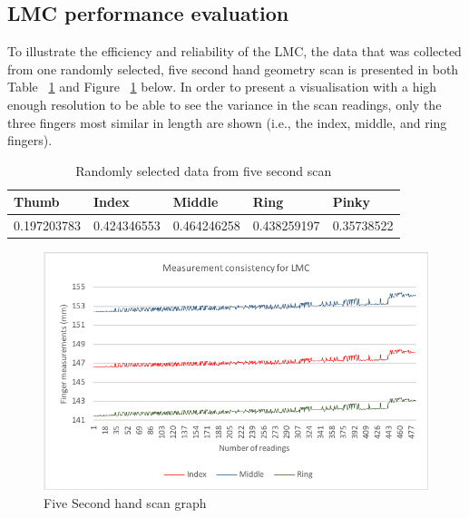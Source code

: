 \subsection{LMC performance evaluation}

To illustrate the efficiency and reliability of the LMC, the data that was collected from one randomly selected, five second hand geometry scan is presented in both Table ~\ref{table: Randomly selected data from five second scan} and Figure ~\ref{fig:Five Second hand scan graph} below. 
In order to present a visualisation with a high enough resolution to be able to see the variance in the scan readings, only the three fingers most similar in length are shown (i.e., the index, middle, and ring fingers). 

    
    \begin{table}[h!]
    \caption{Randomly selected data from five second scan}
    \centering
     \begin{tabular}{|p{} | p{}| p{}| p{}| p{}|} 
     \hline
    	\textbf{Thumb} & \textbf{Index} & \textbf{Middle} & \textbf{Ring} & \textbf{Pinky} \\ [1ex] 
     \hline\hline 
     0.197203783 & 0.424346553 &  0.464246258 & 0.438259197 & 0.35738522 \\[1ex]
     \hline 
     \end{tabular}
     \label{table: Randomly selected data from five second scan}
    \end{table}

    
    \begin{figure}[htbp!] 
    \centering    
    \includegraphics[width=1.0\textwidth]{Chapter4/Figs/Consistency.png}
    \caption[Five Second hand scan graph]{Five Second hand scan graph}
    \label{fig:Five Second hand scan graph}
    \end{figure}
    
